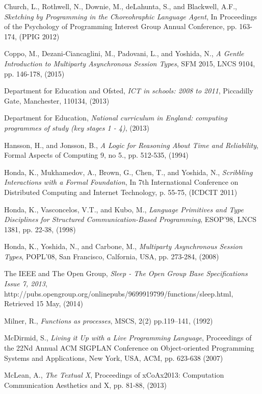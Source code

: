 \documentclass[11pt, abstracton, twoside, titlepage=true]{scrartcl}
\begin{document}
\begin{thebibliography}{9}
  Church, L., Rothwell, N., Downie, M., deLahunta, S., and Blackwell, A.F.,
  \emph{Sketching by Programming in the Choreohraphic Language Agent},
  In Proceedings of the Psychology of Programming Interest Group Annual Conference,
  pp. 163-174,
  (PPIG 2012)

  Coppo, M., Dezani-Ciancaglini, M., Padovani, L., and Yoshida, N.,
  \emph{A Gentle Introduction to Multiparty Asynchronous Session Types},
  SFM 2015, LNCS 9104, pp. 146-178,
  (2015)

  Department for Education and Ofsted,
  \emph{ICT in schools: 2008 to 2011},
  Piccadilly Gate,
  Manchester,
  110134,
  (2013)

  Department for Education,
  \emph{National curriculum in England: computing programmes of study (key stages 1 - 4)},
  (2013)

  Hansson, H., and Jonsson, B.,
  \emph{A Logic for Reasoning About Time and Reliability},
  Formal Aspects of Computing 9,
  no 5., pp. 512-535,
  (1994)

  Honda, K., Mukhamedov, A., Brown, G., Chen, T., and Yoshida, N.,
  \emph{Scribbling Interactions with a Formal Foundation},
  In 7th International Conference on Distributed Computing and Internet Technology,
  p. 55-75,
  (ICDCIT 2011)

  Honda, K., Vasconcelos, V.T., and Kubo, M.,
  \emph{Language Primitives and Type Disciplines for Structured Communication-Based Programming},
  ESOP'98, LNCS 1381,
  pp. 22-38,
  (1998)

  Honda, K., Yoshida, N., and Carbone, M.,
  \emph{Multiparty Asynchronous Session Types},
  POPL'08, San Francisco, Calfornia, USA,
  pp. 273-284,
  (2008)

  The IEEE and The Open Group,
  \emph{Sleep - The Open Group Base Specifications Issue 7, 2013},
  http://pubs.opengroup.org/onlinepubs/9699919799/functions/sleep.html,
  Retrieved 15 May,
  (2014)

   Milner, R.,
   \emph{Functions as processes},
   MSCS, 2(2) pp.119–141,
   (1992)

  McDirmid, S.,
  \emph{Living it Up with a Live Programming Language},
  Proceedings of the 22Nd Annual ACM SIGPLAN Conference on Object-oriented Programming Systems and Applications,
  New York, USA,
  ACM, pp. 623-638
  (2007)

  McLean, A.,
  \emph{The Textual X},
  Proceedings of xCoAx2013: Computation Communication Aesthetics and X,
  pp. 81-88,
  (2013)


\end{thebibliography}
\end{document}
